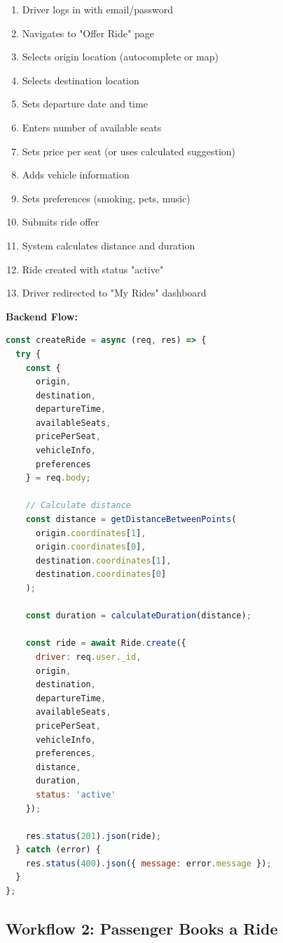 \documentclass[12pt,a4paper]{article}
\begin{document}
\begin{enumerate}
    \item Driver logs in with email/password
    \item Navigates to "Offer Ride" page
    \item Selects origin location (autocomplete or map)
    \item Selects destination location
    \item Sets departure date and time
    \item Enters number of available seats
    \item Sets price per seat (or uses calculated suggestion)
    \item Adds vehicle information
    \item Sets preferences (smoking, pets, music)
    \item Submits ride offer
    \item System calculates distance and duration
    \item Ride created with status "active"
    \item Driver redirected to "My Rides" dashboard
\end{enumerate}

\textbf{Backend Flow:}
\begin{lstlisting}[language=JavaScript, caption=Create Ride Controller]
const createRide = async (req, res) => {
  try {
    const {
      origin,
      destination,
      departureTime,
      availableSeats,
      pricePerSeat,
      vehicleInfo,
      preferences
    } = req.body;
    
    // Calculate distance
    const distance = getDistanceBetweenPoints(
      origin.coordinates[1],
      origin.coordinates[0],
      destination.coordinates[1],
      destination.coordinates[0]
    );
    
    const duration = calculateDuration(distance);
    
    const ride = await Ride.create({
      driver: req.user._id,
      origin,
      destination,
      departureTime,
      availableSeats,
      pricePerSeat,
      vehicleInfo,
      preferences,
      distance,
      duration,
      status: 'active'
    });
    
    res.status(201).json(ride);
  } catch (error) {
    res.status(400).json({ message: error.message });
  }
};
\end{lstlisting}

\subsection{Workflow 2: Passenger Books a Ride}
\end{document}
